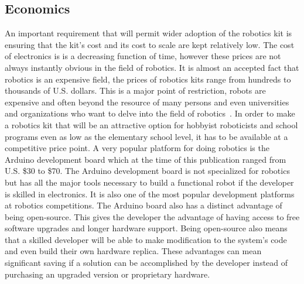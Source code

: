 \subsection{Economics} %
An important requirement that will permit wider adoption of the robotics kit is ensuring that the kit's cost and its cost to scale are kept relatively low. The cost of electronics is is a decreasing function of time, however these prices are not always instantly obvious in the field of robotics. It is almost an accepted fact that robotics is an expensive field, the prices of robotics kits range from hundreds to thousands of U.S. dollars. This is a major point of restriction, robots are expensive and often beyond the resource of many persons and even universities and organizations who want to delve into the field of robotics~\parencite{vr}. In order to make a robotics kit that will be an attractive option for hobbyist roboticists and school programs even as low as the elementary school level, it has to be available at a competitive price point. A very popular platform for doing robotics is the Arduino development board which at the time of this publication ranged from U.S. \$30 to \$70. The Arduino development board is not specialized for robotics but has all the major tools necessary to build a functional robot if the developer is skilled in electronics. It is also one of the most popular development platforms at robotics competitions.
The Arduino board also has a distinct advantage of being open-source. This gives the developer the advantage of having access to free software upgrades and longer hardware support. Being open-source also means that a skilled developer will be able to make modification to the system's code and even build their own hardware replica. These advantages can mean significant saving if a solution can be accomplished by the developer instead of purchasing an upgraded version or proprietary hardware.

\label{sub:economics}


